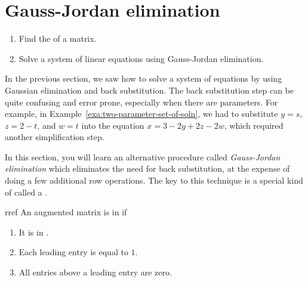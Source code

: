 \section{Gauss-Jordan elimination}

\begin{outcome}
  \begin{enumerate}
  \item Find the {\rref} of a matrix.
  \item Solve a system of linear equations using Gauss-Jordan elimination.
  \end{enumerate}
\end{outcome}

In the previous section, we saw how to solve a system of equations by
using Gaussian elimination and back substitution. The back
substitution step can be quite confusing and error prone, especially
when there are parameters. For example, in
Example~\ref{exa:two-parameter-set-of-soln}, we had to substitute $y=s$,
$z=2-t$, and $w=t$ into the equation $x=3-2y+2z-2w$, which required
another simplification step.

In this section, you will learn an alternative procedure called {\em
  Gauss-Jordan elimination} which eliminates the need for back
substitution, at the expense of doing a few additional row operations.
The key to this technique is a special kind of {\ef} called a
{\em {\rref}}.

\begin{definition}{\Rref}{rref}
  An augmented matrix is in \textbf{\rref}\eindex{\rref} if
  
  \begin{enumerate}
  \item It is in {\ef}.
    
  \item Each leading entry is equal to $1$.
    
  \item All entries above a leading entry are zero.
  \end{enumerate}
\end{definition}

